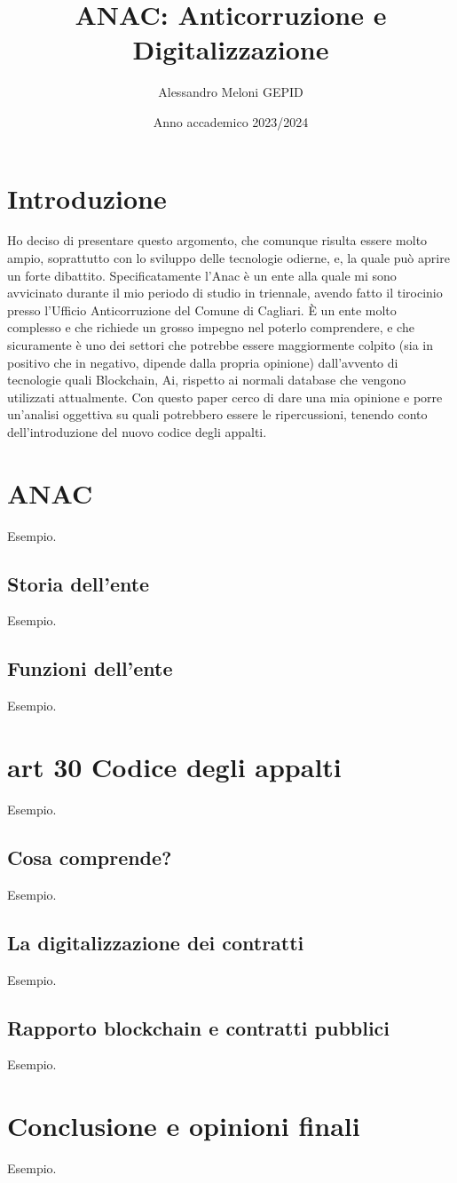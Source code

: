 \documentclass{article}
\title{ANAC: Anticorruzione e Digitalizzazione}
\author{Alessandro Meloni GEPID}
\date{Anno accademico 2023/2024}
\begin{document}
\maketitle

\centering \tableofcontents
\newpage\centering
\section{Introduzione}
\flushleft 
\begin{justify}
Ho deciso di presentare questo argomento, che comunque risulta essere molto ampio, soprattutto con lo sviluppo delle tecnologie odierne, e, la quale può aprire un forte dibattito. Specificatamente l'Anac è un ente alla quale mi sono avvicinato durante il mio periodo di studio in triennale, avendo fatto il tirocinio presso l'Ufficio Anticorruzione del Comune di Cagliari. È un ente molto complesso e che richiede un grosso impegno nel poterlo comprendere, e che sicuramente è uno dei settori che potrebbe essere maggiormente colpito (sia in positivo che in negativo, dipende dalla propria opinione) dall'avvento di tecnologie quali Blockchain, Ai, rispetto ai normali database che vengono utilizzati attualmente. Con questo paper cerco di dare una mia opinione e porre un'analisi oggettiva su quali potrebbero essere le ripercussioni, tenendo conto dell'introduzione del nuovo codice degli appalti.
\end{justify}
\newpage\centering
\section{ANAC}
\flushleft Esempio.

\flushleft \subsection{Storia dell'ente}
Esempio.
\flushleft \subsection{Funzioni dell'ente}
Esempio.
\newpage\centering
\section{art 30 Codice degli appalti}
\flushleft Esempio.

\flushleft \subsection{Cosa comprende?}
Esempio.
\flushleft \subsection{La digitalizzazione dei contratti}
Esempio.
\flushleft \subsection{Rapporto blockchain e contratti pubblici}
Esempio.

\newpage \centering
\section{Conclusione e opinioni finali}
\flushleft Esempio.
\end{document}
